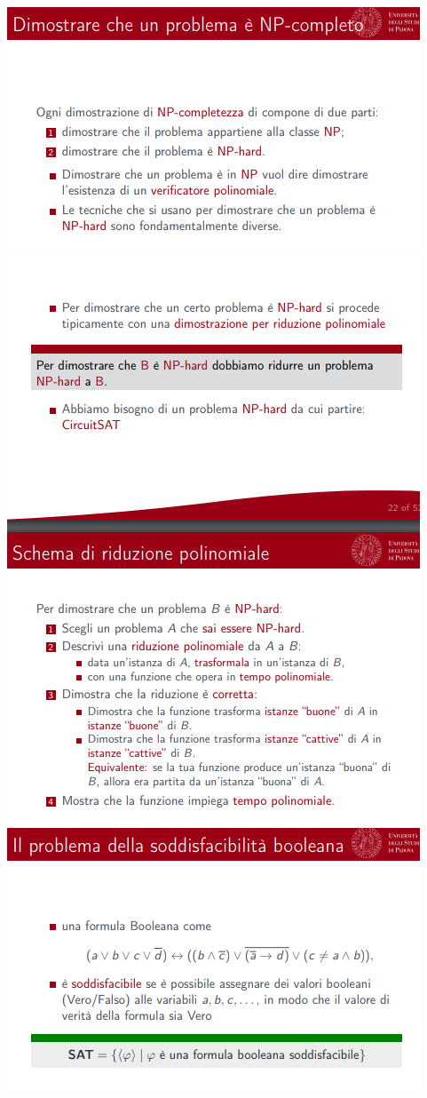 \documentclass[]{article}
\begin{document}
\begin{center}
				\includegraphics[scale=0.8]{NP5.png}
				\includegraphics[scale=0.8]{NP6.png}
				\includegraphics[scale=0.8]{NP7.png}

\end{center}
\end{document}
